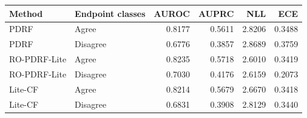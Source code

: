 \begin{tabular}{llrrrr}
\toprule
Method & Endpoint classes & AUROC & AUPRC & NLL & ECE \\
\midrule
PDRF & Agree & 0.8177 & 0.5611 & 2.8206 & 0.3488 \\
PDRF & Disagree & 0.6776 & 0.3857 & 2.8689 & 0.3759 \\
RO-PDRF-Lite & Agree & 0.8235 & 0.5718 & 2.6010 & 0.3419 \\
RO-PDRF-Lite & Disagree & 0.7030 & 0.4176 & 2.6159 & 0.2073 \\
Lite-CF & Agree & 0.8214 & 0.5679 & 2.6670 & 0.3418 \\
Lite-CF & Disagree & 0.6831 & 0.3908 & 2.8129 & 0.3440 \\
\bottomrule
\end{tabular}

